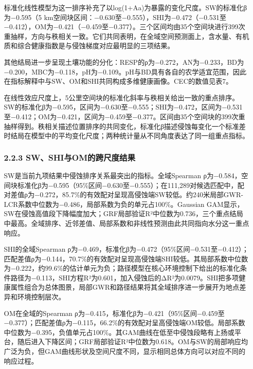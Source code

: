 \documentclass[
  11pt,
  a4paper,
]{ctexart}
\begin{document}
标准化线性模型为这一排序补充了以log(1+Aa)为暴露的变化尺度。SW的标准化β为−0.595（5
km空间块区间：−0.630至−0.555），SHI为−0.472（−0.531至−0.412），OM为−0.421（−0.459至−0.377）。三个区间均由35个空间块进行399次重抽样，方向与秩相关一致。它们共同表明，在全域空间预测面上，含水量、有机质和综合健康指数是与侵蚀梯度对应最明显的三项结果。

其他结局进一步呈现土壤功能的分化：RESP的ρ为−0.272，AN为−0.233，BD为−0.200，MBC为−0.118，pH为−0.109。pH与BD具有各自的农学适宜范围，因此在指标解释中与SW、OM和SHI共同构成多维健康画像。CEC的数值见表7。

在线性效应尺度上，5公里空间块的标准化斜率与秩相关给出一致的重点排序。SW的标准化β为−0.595，区间为−0.630至−0.555；SHI为−0.472，区间为−0.531至−0.412；OM为−0.421，区间为−0.459至−0.377。区间由35个空间块的399次重抽样得到。秩相关描述位置排序的共同变化，标准化β描述侵蚀每变化一个标准差时结局在模型中的平均变化尺度；两种统计量从不同角度表达了同一组重点指标。

\hypertarget{swshiux4e0eomux7684ux8de8ux5c3aux5ea6ux7ed3ux679c}{%
\subsubsection{2.2.3
SW、SHI与OM的跨尺度结果}\label{swshiux4e0eomux7684ux8de8ux5c3aux5ea6ux7ed3ux679c}}

SW是当前九项结果中侵蚀排序关系最突出的指标。全域Spearman
ρ为−0.584，空间块标准化β为−0.595（95\%区间−0.630至−0.555）；在111,289对候选匹配中，配对差值ρ为−0.272，85.7\%的有效配对呈现高侵蚀端SW较低。约240米局部GWR-LCR系数中位数为−0.486，局部系数为负的单元占100\%。Gaussian
GAM显示，SW在侵蚀高值段下降幅度加大；GRF局部验证R²中位数为0.736，三个重点结局中最高。全域排序、近邻差值、局部系数和非线性预测由此共同指向水分这一重点响应。

SHI的全域Spearman
ρ为−0.469，标准化β为−0.472（95\%区间−0.531至−0.412）；匹配差值ρ为−0.144，70.7\%的有效配对呈现高侵蚀端SHI较低。其局部系数中位数为−0.222，约99.6\%的估计单元为负；路径模型在核心环境控制下给出的标准化条件路径为−0.113，SHI方程R²为0.601，加入侵蚀后的ΔR²为0.0079。SHI把多项健康属性组合为总体图景，局部GWR和路径结果将其全域排序进一步展开为地点差异和环境控制层次。

OM在全域的Spearman
ρ为−0.415，标准化β为−0.421（95\%区间−0.459至−0.377）；匹配差值ρ为−0.115，66.2\%的有效配对呈高侵蚀端OM较低。局部系数中位数为−0.395，负值单元占100\%。其GAM曲线在低至中侵蚀段略有上扬或平台，随后进入下降区间；GRF局部验证R²中位数为0.618。OM与SW的局部响应均广泛为负，但GAM曲线形状及空间尺度不同，显示相同总体方向可以对应不同的响应过程。
\end{document}
